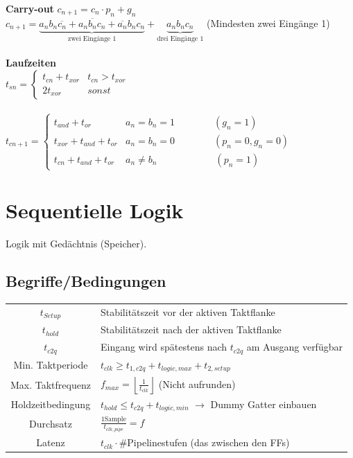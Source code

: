 \documentclass[6pt,a4paper]{scrartcl}
\newcommand{\ol}[1]{\ensuremath{\overline{#1}}}									%
\newcommand{\ra}[0]{\ensuremath{\rightarrow}} 									%
\begin{document}
\begin{multicols*}{3}
\textbf{Carry-out} $c_{n+1} = c_n \cdot p_n + g_n$\\
$c_{n+1}=\underbrace{a_nb_n\ol{c_n} + a_n\ol{b_n}c_n + \ol{a_n}b_nc_n}_{\text{zwei Eingänge 1}} + \underbrace{a_nb_nc_n}_{\text{drei Eingänge 1}}$ (Mindesten zwei Eingänge 1)
\\ \\
\textbf{Laufzeiten} \\
$t_{sn} = \begin{cases} t_{cn} + t_{xor} & t_{cn} > t_{xor} \\ 2 t_{xor} & sonst \end{cases}$\\ \\
$t_{cn+1} =
\begin{cases}
	t_{and} + t_{or}           & a_n = b_n = 1 \qquad \qquad (g_n=1)   \\
	t_{xor} + t_{and} + t_{or} & a_n = b_n = 0 \qquad \qquad  (p_n = 0, g_n = 0) \\
	t_{cn} + t_{and} + t_{or}  & a_n \ne b_n \qquad \qquad \qquad  (p_n = 1)
\end{cases}$\\

\section{Sequentielle Logik}
Logik mit Gedächtnis (Speicher).
	\subsection{Begriffe/Bedingungen}
	\begin{tabular}{c|l}
	$t_{Setup}$ & Stabilitätszeit vor der aktiven Taktflanke\\
	$t_{hold}$ & Stabilitätszeit nach  der aktiven Taktflanke\\
	$t_{c2q}$ & Eingang wird spätestens nach $t_{c2q}$ am Ausgang verfügbar\\
	 Min. Taktperiode &  $t_{clk} \ge t_{1,c2q} + t_{logic,max} + t_{2,setup}$  \\
	 Max. Taktfrequenz & $f_{max} = \left\lfloor \frac{1}{t_{clk}} \right\rfloor$ \qquad (Nicht aufrunden) \\
	 Holdzeitbedingung & $t_{hold} \le t_{c2q} + t_{logic,min}$  $\ra$ Dummy Gatter einbauen\\
	 Durchsatz & $\frac{1 \text{Sample}}{t_{clk,pipe}} = f$ \\
	 Latenz & $t_{clk} \cdot \#$Pipelinestufen (das zwischen den FFs) \\
	\end{tabular}



\end{multicols*}
\end{document}
